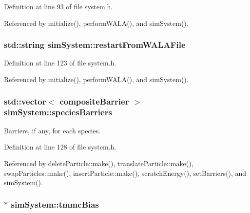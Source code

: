 Definition at line 93 of file system.\-h.



Referenced by initialize(), perform\-W\-A\-L\-A(), and sim\-System().

\hypertarget{classsim_system_afbf0b172dc35572e71ec6d27a018e2fc}{
\subsubsection[{restart\-From\-W\-A\-L\-A\-File}]{\setlength{\rightskip}{0pt plus 5cm}std\-::string sim\-System\-::restart\-From\-W\-A\-L\-A\-File}}\label{classsim_system_afbf0b172dc35572e71ec6d27a018e2fc}


Definition at line 123 of file system.\-h.



Referenced by initialize(), perform\-W\-A\-L\-A(), and sim\-System().

\hypertarget{classsim_system_a5ae652ff4519f39c3862abae32a9581b}{
\subsubsection[{species\-Barriers}]{\setlength{\rightskip}{0pt plus 5cm}std\-::vector$<$ {\bf composite\-Barrier} $>$ sim\-System\-::species\-Barriers}}\label{classsim_system_a5ae652ff4519f39c3862abae32a9581b}


Barriers, if any, for each species. 



Definition at line 128 of file system.\-h.



Referenced by delete\-Particle\-::make(), translate\-Particle\-::make(), swap\-Particles\-::make(), insert\-Particle\-::make(), scratch\-Energy(), set\-Barriers(), and sim\-System().

\hypertarget{classsim_system_a13173f45a1e40a5f5a3552b0ebe15b54}{
\subsubsection[{tmmc\-Bias}]{$\ast$ sim\-System\-::tmmc\-Bias}}\label{classsim_system_a13173f45a1e40a5f5a3552b0ebe15b54}



